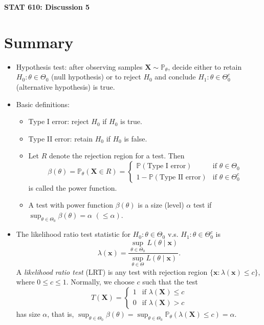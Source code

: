 \documentclass[12pt]{extarticle}
\newcommand{\x}{\mathbf x}
\newcommand{\X}{\mathbf X}
\begin{document}
\begin{center}
{\large \bf STAT 610: Discussion 5}
\end{center}
\vspace{0.22cm}

\section{Summary}
\begin{itemize}
	\item Hypothesis test: after observing samples $\mathbf X\sim \mathbb P_\theta$, decide either to retain $H_0: \theta\in\Theta_0$ (null hypothesis) or to reject $H_0$ and conclude $H_1: \theta\in\Theta_0^c$ (alternative hypothesis) is true.
    \item Basic definitions: 
    \begin{itemize}
        \item Type I error: reject $H_0$ if $H_0$ is true.
        \item Type II error: retain $H_0$ if $H_0$ is false.
        \item Let $R$ denote the rejection region for a test. Then 
        $$\beta(\theta) = \mathbb P_\theta(\mathbf X\in R) = \begin{cases}
            \mathbb P(\text{Type I error}) & \text{if }\theta\in\Theta_0\\
            1 - \mathbb P(\text{Type II error}) &  \text{if }\theta\in\Theta_0^c
        \end{cases}$$
        is called the power function.
        \item A test with power function $\beta(\theta)$ is a size (level) $\alpha$ test if $\sup_{\theta\in\Theta_0}\beta(\theta) = \alpha$ $(\leq\alpha)$.
    \end{itemize}
    \item The likelihood ratio test statistic for $H_0: \theta\in\Theta_0$ v.s. $H_1: \theta\in\Theta_0^c$ is
        $$\lambda(\x) = \dfrac{\sup_{\theta\in\Theta_0}L(\theta\mid\x)}{\sup_{\theta\in\Theta}L(\theta\mid\x)}.$$
        A \textit{likelihood ratio test} (LRT) is any test with rejection region $\{\x: \lambda(\x)\leq c\}$, where $0\leq c\leq 1$. Normally, we choose $c$ such that the test $$T(\mathbf X) = \begin{cases}
            1 & \text{if }\lambda(\X)\leq c\\
            0 & \text{if }\lambda(\X) > c
        \end{cases}$$ has size $\alpha$, that is, $\sup_{\theta\in\Theta_0}\beta(\theta) = \sup_{\theta\in\Theta_0}\mathbb P_\theta(\lambda(\X)\leq c) = \alpha$.

\end{itemize}
\end{document}
